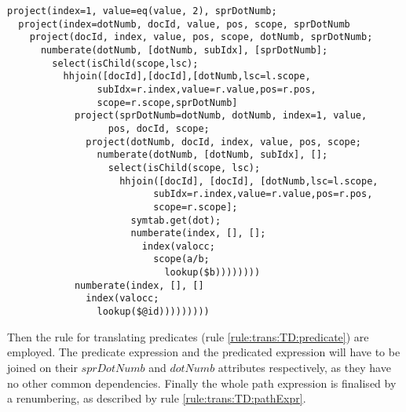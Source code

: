 \begin{Verbatim}
project(index=1, value=eq(value, 2), sprDotNumb;
  project(index=dotNumb, docId, value, pos, scope, sprDotNumb
    project(docId, index, value, pos, scope, dotNumb, sprDotNumb;
      numberate(dotNumb, [dotNumb, subIdx], [sprDotNumb];
        select(isChild(scope,lsc);
          hhjoin([docId],[docId],[dotNumb,lsc=l.scope,
                subIdx=r.index,value=r.value,pos=r.pos,
                scope=r.scope,sprDotNumb]
            project(sprDotNumb=dotNumb, dotNumb, index=1, value,
                  pos, docId, scope;
              project(dotNumb, docId, index, value, pos, scope;
                numberate(dotNumb, [dotNumb, subIdx], [];
                  select(isChild(scope, lsc);
                    hhjoin([docId], [docId], [dotNumb,lsc=l.scope,
                          subIdx=r.index,value=r.value,pos=r.pos,
                          scope=r.scope];
                      symtab.get(dot);
                      numberate(index, [], [];
                        index(valocc;
                          scope(a/b;
                            lookup($b))))))))
            numberate(index, [], []
              index(valocc;
                lookup($@id)))))))))
\end{Verbatim}

Then the rule for translating predicates (rule \ref{rule:trans:TD:predicate}) are employed. The predicate
expression and the predicated expression will have to be joined on their $sprDotNumb$ and $dotNumb$ attributes
respectively, as they have no other common dependencies. Finally the whole path expression is finalised by a
renumbering, as described by rule \ref{rule:trans:TD:pathExpr}.


